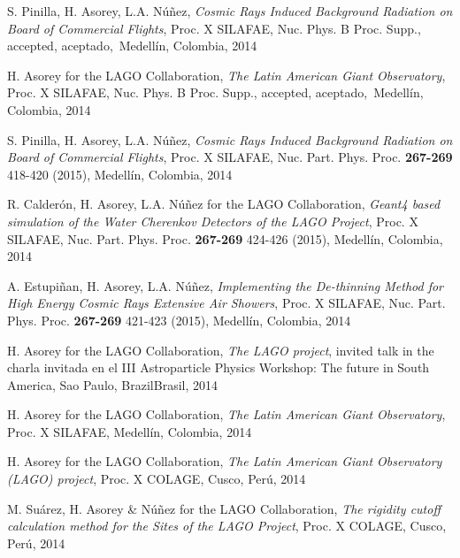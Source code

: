 \begin{etaremune}
\item {}S. Pinilla, H. Asorey, L.A. Núñez, {\emph{Cosmic Rays Induced Background Radiation on Board of Commercial Flights}}, \en Proc. X SILAFAE, Nuc. Phys. B Proc. Supp., \ifeng accepted, \else aceptado,\fi\ Medellín, Colombia, 2014

\item {}H. Asorey for the LAGO Collaboration, {\emph{The Latin American Giant Observatory}}, \en Proc. X SILAFAE, Nuc. Phys. B Proc. Supp., \ifeng accepted, \else aceptado,\fi\ Medellín, Colombia, 2014

\item {}S. Pinilla, H. Asorey, L.A. Núñez, {\emph{Cosmic Rays Induced Background Radiation on Board of Commercial Flights}}, \en Proc. X SILAFAE,  Nuc. Part. Phys. Proc. {\bf{267-269}} 418-420 (2015), Medellín, Colombia, 2014

\item {}R. Calderón, H. Asorey, L.A. Núñez for the LAGO Collaboration, {\emph{Geant4 based simulation of the Water Cherenkov Detectors of the LAGO Project}}, \en Proc. X SILAFAE, Nuc. Part. Phys. Proc. {\bf{267-269}} 424-426 (2015), Medellín, Colombia, 2014

\item {}A. Estupiñan, H. Asorey, L.A. Núñez, {\emph{Implementing the De-thinning Method for High Energy Cosmic Rays Extensive Air Showers}}, \en Proc. X SILAFAE, Nuc. Part. Phys. Proc. {\bf{267-269}} 421-423 (2015), Medellín, Colombia, 2014

\item {}H. Asorey for the LAGO Collaboration, {\emph{The LAGO project}}, \ifeng invited talk in the \else charla invitada en el \fi III Astroparticle Physics Workshop: The future in South America, Sao Paulo, \ifeng Brazil\else Brasil\fi, 2014
  
\item {}H. Asorey for the LAGO Collaboration, {\emph{The Latin American Giant Observatory}}, \en Proc. X SILAFAE, Medellín, Colombia, 2014

\item {}H. Asorey for the LAGO Collaboration, {\emph{The Latin American Giant Observatory (LAGO) project}}, \en Proc. X COLAGE, Cusco, Perú, 2014

\item {}M. Suárez, H. Asorey \& Núñez for the LAGO Collaboration, {\emph{The rigidity cutoff calculation method for the Sites of the LAGO Project}}, \en Proc. X COLAGE, Cusco, Perú, 2014


\end{etaremune}
